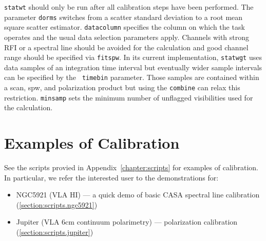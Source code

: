 {\tt statwt} should only be run after all calibration steps have been
performed. The parameter {\tt dorms} switches from a scatter standard
deviation to a root mean square scatter estimator. {\tt datacolumn}
specifies the column on which the task operates and the usual data
selection parameters apply. Channels with strong RFI or a spectral
line should be avoided for the calculation and good channel range
should be specified via {\tt fitspw}. In its current implementation,
{\tt statwgt} uses data samples of an integration time interval but
eventually wider sample intervals can be specified by the {\tt
  timebin} parameter. Those samples are contained within a scan, spw,
and polarization product but using the {\tt combine} can relax this
restriction. {\tt minsamp} sets the minimum number of unflagged
visibilities used for the calculation.




\section{Examples of Calibration}
\label{section:cal.examples}

See the scripts provied in Appendix~\ref{chapter:scripts} for examples of
calibration.  In particular, we refer
the interested user to the demonstrations for:
\begin{itemize}
\item NGC5921 (VLA HI) --- a quick demo of basic CASA spectral line calibration
      (\ref{section:scripts.ngc5921})
\item Jupiter (VLA 6cm continuum polarimetry) --- polarization calibration
      (\ref{section:scripts.jupiter})
\end{itemize}



